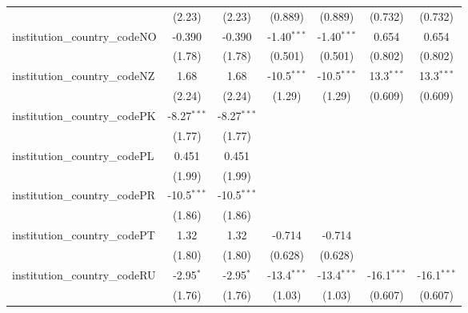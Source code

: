 \begin{tabular}{lcccccc}
                                         & (2.23)        & (2.23)        & (0.889)       & (0.889)       & (0.732)       & (0.732)\\   
   institution\_country\_codeNO          & -0.390        & -0.390        & -1.40$^{***}$ & -1.40$^{***}$ & 0.654         & 0.654\\   
                                         & (1.78)        & (1.78)        & (0.501)       & (0.501)       & (0.802)       & (0.802)\\   
   institution\_country\_codeNZ          & 1.68          & 1.68          & -10.5$^{***}$ & -10.5$^{***}$ & 13.3$^{***}$  & 13.3$^{***}$\\   
                                         & (2.24)        & (2.24)        & (1.29)        & (1.29)        & (0.609)       & (0.609)\\   
   institution\_country\_codePK          & -8.27$^{***}$ & -8.27$^{***}$ &               &               &               &   \\   
                                         & (1.77)        & (1.77)        &               &               &               &   \\   
   institution\_country\_codePL          & 0.451         & 0.451         &               &               &               &   \\   
                                         & (1.99)        & (1.99)        &               &               &               &   \\   
   institution\_country\_codePR          & -10.5$^{***}$ & -10.5$^{***}$ &               &               &               &   \\   
                                         & (1.86)        & (1.86)        &               &               &               &   \\   
   institution\_country\_codePT          & 1.32          & 1.32          & -0.714        & -0.714        &               &   \\   
                                         & (1.80)        & (1.80)        & (0.628)       & (0.628)       &               &   \\   
   institution\_country\_codeRU          & -2.95$^{*}$   & -2.95$^{*}$   & -13.4$^{***}$ & -13.4$^{***}$ & -16.1$^{***}$ & -16.1$^{***}$\\   
                                         & (1.76)        & (1.76)        & (1.03)        & (1.03)        & (0.607)       & (0.607)\\   

\end{tabular}
